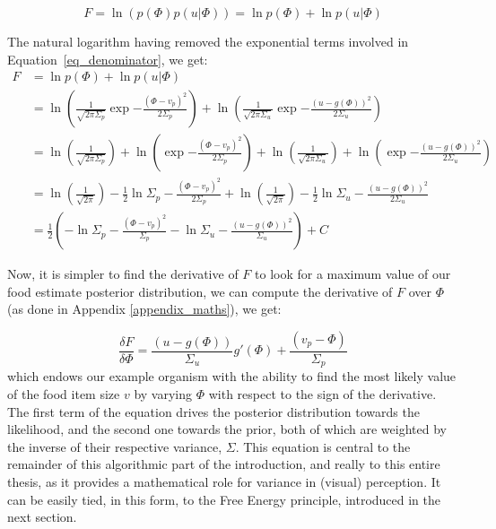 \begin{equation}
     F = \ln  \left( p(\Phi) p(u|\Phi) \right) = \ln p(\Phi) + \ln p(u|\Phi)
\end{equation}

The natural logarithm having removed the exponential terms involved in Equation~\ref{eq_denominator}, we get: 
\begin{equation}
\label{eq_F}
  \begin{aligned}
    F & = \ln p(\Phi) + \ln p(u|\Phi) \\ 
      & =\ln \left( \frac{1}{\sqrt{2\pi\Sigma_p}} \exp{-\frac{(\Phi-v_p)^2}{2\Sigma_p}}\right) + \ln \left( \frac{1}{\sqrt{2\pi\Sigma_u}} \exp{-\frac{(u-g(\Phi))^2}{2\Sigma_u}} \right) \\
      & = \ln \left( \frac{1}{\sqrt{2\pi\Sigma_p}} \right) + \ln \left(\exp{-\frac{(\Phi-v_p)^2}{2\Sigma_p}} \right) + 
            \ln \left( \frac{1}{\sqrt{2\pi\Sigma_u}} \right) + \ln \left(\exp{-\frac{(u-g(\Phi))^2}{2\Sigma_u}} \right) \\
      & = \ln \left( \frac{1}{\sqrt{2\pi}} \right) - \frac{1}{2} \ln \Sigma_p- \frac{(\Phi-v_p)^2}{2\Sigma_p} + 
            \ln \left( \frac{1}{\sqrt{2\pi}} \right) - \frac{1}{2} \ln \Sigma_u -  \frac{(u-g(\Phi))^2}{2\Sigma_u} \\ 
      & =  \frac{1}{2} \left( - \ln \Sigma_p - \frac{(\Phi - v_p)^2}{\Sigma_p}  - \ln \Sigma_u - \frac{(u - g(\Phi))^2}{\Sigma_u}\right) + C
  \end{aligned}
\end{equation}

Now, it is simpler to find the derivative of $F$ to look for a maximum value of our food estimate posterior distribution, we can compute the derivative of $F$ over $\Phi$ (as done in Appendix \ref{appendix_maths}), we get:

\begin{equation}
\label{eq_dF_dPhi}
    \frac{\delta F}{\delta \Phi} = \frac{(u-g(\Phi))}{\Sigma_u} g'(\Phi)  + \frac{(v_p-\Phi)}{\Sigma_p}  
\end{equation}
which endows our example organism with the ability to find the most likely value of the food item size $v$ by varying $\Phi$ with respect to the sign of the derivative. The first term of the equation drives the posterior distribution towards the likelihood, and the second one towards the prior, both of which are weighted by the inverse of their respective variance, $\Sigma$.
This equation is central to the remainder of this algorithmic part of the introduction, and really to this entire thesis, as it provides a mathematical role for variance in (visual) perception. It can be easily tied, in this form, to the Free Energy principle, introduced in the next section.



